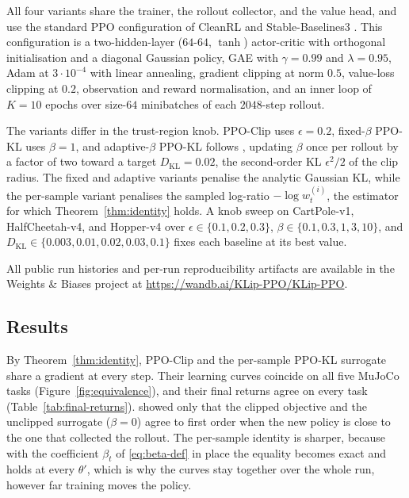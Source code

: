 \documentclass{article}
\begin{document}
All four variants share the trainer, the rollout collector, and the
value head, and use the standard PPO configuration of CleanRL
\citep{huang2022cleanrl} and Stable-Baselines3 \citep{raffin2021sb3}.
This configuration is a two-hidden-layer ($64$-$64$, $\tanh$)
actor-critic with orthogonal initialisation and a diagonal Gaussian
policy, GAE \citep{schulman2016gae} with $\gamma = 0.99$ and
$\lambda = 0.95$, Adam at $3 \cdot 10^{-4}$ with linear annealing,
gradient clipping at norm $0.5$, value-loss clipping at $0.2$,
observation and reward normalisation, and an inner loop of $K = 10$
epochs over size-$64$ minibatches of each $2048$-step rollout.

The variants differ in the trust-region knob. PPO-Clip uses
$\epsilon = 0.2$, fixed-$\beta$ PPO-KL uses $\beta = 1$, and
adaptive-$\beta$ PPO-KL follows \citet{schulman2017ppo}, updating $\beta$
once per rollout by a factor of two toward a target
$D_{\mathrm{KL}} = 0.02$, the second-order KL $\epsilon^2/2$ of the clip
radius. The fixed and adaptive variants penalise the analytic Gaussian
KL, while the per-sample variant penalises the sampled log-ratio
$-\log w_t^{(i)}$, the estimator for which Theorem~\ref{thm:identity}
holds. A knob sweep on CartPole-v1, HalfCheetah-v4, and Hopper-v4 over
$\epsilon \in \{0.1, 0.2, 0.3\}$, $\beta \in \{0.1, 0.3, 1, 3, 10\}$, and
$D_{\mathrm{KL}} \in \{0.003, 0.01, 0.02, 0.03, 0.1\}$ fixes each baseline
at its best value.

All public run histories and per-run reproducibility artifacts are available in
the Weights \& Biases project at \url{https://wandb.ai/KLip-PPO/KLip-PPO}.


\subsection{Results}
\label{sec:exp-results}


By Theorem~\ref{thm:identity}, PPO-Clip and the per-sample PPO-KL
surrogate share a gradient at every step. Their learning curves coincide
on all five MuJoCo tasks (Figure~\ref{fig:equivalence}), and their final
returns agree on every task (Table~\ref{tab:final-returns}). \citet{schulman2017ppo} showed
only that the clipped objective and the unclipped surrogate ($\beta = 0$)
agree to first order when the new policy is close to the one that collected
the rollout. The per-sample identity is
sharper, because with the coefficient $\beta_t$ of \eqref{eq:beta-def} in
place the equality becomes exact and holds at every $\theta'$, which is why
the curves stay together over the whole run, however far training moves the
policy.
\end{document}
